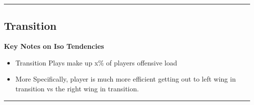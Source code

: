 \documentclass[a4paper,12pt]{article}
\begin{document}
\vspace{0em} %
\hrule height 1pt width 1\textwidth %
\vspace{1em} %

\clearpage

\subsection{Transition}
\vspace{0.25em} %
\textbf{Key Notes on Iso Tendencies}
\vspace{0.5em} %

\begin{itemize}
    \item Transition Plays make up x\% of players offensive load
    \vspace{0.3em} %
    \item More Specifically, player is much more efficient getting out to left wing in transition vs the right wing in transition. 
\end{itemize}

\vspace{1em} %
\hrule height 1pt width 1\textwidth %
\vspace{0em} %
\end{document}

